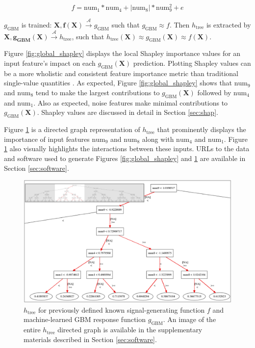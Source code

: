 \documentclass[11pt]{asaproc}
\begin{document}
\begin{equation}
\label{eq:f}
f = \text{num} _1 * \text{num}_4 + |\text{num}_8| * \text{num}_9^2 + e
\end{equation}

\noindent$g_{\text{GBM}}$ is trained: $ \mathbf{X}, \mathbf{f(X)} \xrightarrow{\mathcal{A}} g_{\text{GBM}}$ such that $g_{\text{GBM}} \approx f$. Then $h_{\text{tree}}$ is extracted by $\mathbf{X}, \mathbf{g_{\text{GBM}}(X)} \xrightarrow{\mathcal{A}} h_{\text{tree}}$, such that $h_{\text{tree}}(\mathbf{X}) \approx g_{\text{GBM}}(\mathbf{X}) \approx f(\mathbf{X})$.

Figure \ref{fig:global_shapley} displays the local Shapley importance values for an input feature's impact on each $g_{\text{GBM}}(\mathbf{X})$ prediction. Plotting Shapley values can be a more wholistic and consistent feature importance metric than traditional single-value quantities \cite{shapley}. As expected, Figure \ref{fig:global_shapley} shows that $\text{num}_9$ and $\text{num}_8$ tend to make the largest contributions to $g_{\text{GBM}}(\mathbf{X})$ followed by $\text{num}_4$ and $\text{num}_1$. Also as expected, noise features make minimal contributions to $g_{\text{GBM}}(\mathbf{X})$. Shapley values are discussed in detail in Section \ref{sec:shap}.

Figure \ref{fig:dt_surrogate} is a directed graph representation of $h_{\text{tree}}$ that prominently displays the importance of input features $\text{num}_9$ and $\text{num}_8$ along with $\text{num}_4$ and $\text{num}_1$. Figure \ref{fig:dt_surrogate} also visually highlights the interactions between these inputs. URLs to the data and software used to generate Figures \ref{fig:global_shapley} and \ref{fig:dt_surrogate} are available in Section \ref{sec:software}.

\begin{figure}[htb]
	\begin{center}
		\includegraphics[scale=0.3]{img/figure_3.eps}
		\caption{$h_{\text{tree}}$ for previously defined known signal-generating function $f$ and machine-learned GBM response function $g_{\text{GBM}}$. An image of the entire $h_{\text{tree}}$ directed graph is available in the supplementary materials described in Section \ref{sec:software}.}
		\label{fig:dt_surrogate}
	\end{center}
\end{figure}
\end{document}
